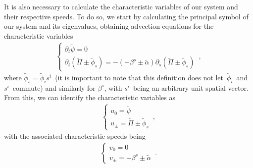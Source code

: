 It is also necessary to calculate the characteristic variables of our system and their respective speeds. To do so, we start by calculating the principal symbol of our system and its eigenvalues, obtaining advection equations for the characteristic variables
%
\begin{align}
    \begin{cases}
        \partial_t \tilde{\psi} = 0 \\
        \partial_t (\tilde{\Pi} \pm \tilde{\phi}_s) = - (-\beta^s \pm \tilde{\alpha}) \partial_s (\tilde{\Pi} \pm \tilde{\phi}_s)
    \end{cases}\,,
\end{align}
%
where $\tilde{\phi}_s = \tilde{\phi}_i s^i$~(it is important to note that this definition does not let~$\tilde{\phi}_i$~and~$s^i$~commute) and similarly for $\beta^s$, with $s^i$~being an arbitrary unit spatial vector. From this, we can identify the characteristic variables as 
%
\begin{align}
    \begin{cases}
        u_0 = \tilde{\psi} \\
        u_\pm = \tilde{\Pi} \pm \tilde{\phi}_s
    \end{cases}\,,
\end{align}
%
with the associated characteristic speeds being
%
\begin{align}
    \begin{cases}
        v_0 = 0 \\
        v_\pm = -\beta^s \pm \tilde{\alpha}
    \end{cases}\,.
\end{align}

